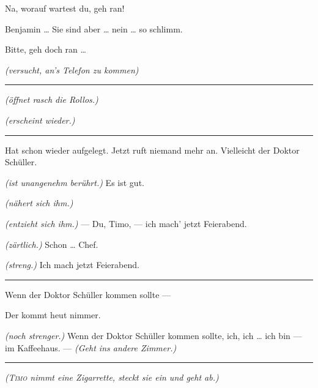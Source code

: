 \documentclass[
	final,
	a4paper,
	ngerman,
	mpinclude = true, %
	twoside = true,
	open = right,
	cleardoublepage = plain,
	DIV = 13,
	BCOR = 1cm,
	titlepage = firstiscover,
	]{scrbook}
\newcommand{\direction}[1]{\textit{(#1)}}
\newenvironment{deletion}{%
		\vspace{0.25\baselineskip}
		\hrule
		\vspace{0.25\baselineskip}
		\color{darkgray}
	}{
		\color{black}
		\vspace{0.25\baselineskip}
		\hrule 
		\vspace{0.25\baselineskip}
	}
\newcommand{\thecharacter}[1]{\textup{\textsc{#1}}\xspace}
\newcommand{\thepraktikant}{\thecharacter{Timo}}
\newcommand{\theherr}{\thecharacter{Benjamin}}
\newcommand{\character}[1]{\item[#1:]}
\newcommand{\praktikant}{\character{\thepraktikant}}
\newcommand{\herr}{\character{\theherr}}
\begin{document}
\begin{play}
	\herr
	Na, worauf wartest du, geh ran!

	\praktikant
	Benjamin \ldots{} Sie sind aber \ldots{} nein \ldots{} so schlimm.

	\herr
	Bitte, geh doch ran \ldots{}

	\praktikant
	\direction{versucht, an's Telefon zu kommen}
	\begin{deletion}
	\herr
	\direction{öffnet rasch die Rollos.}

	\praktikant
	\direction{erscheint wieder.}
	\end{deletion}
	Hat schon wieder aufgelegt. Jetzt ruft niemand mehr an. Vielleicht der Doktor Schüller.

	\herr
	\direction{ist unangenehm berührt.} Es ist gut.

	\praktikant
	\direction{nähert sich ihm.}

	\herr
	\direction{entzieht sich ihm.} --- Du, Timo, --- ich mach' jetzt Feierabend.

	\praktikant
	\direction{zärtlich.} Schon \ldots{} Chef.

	\herr
	\direction{streng.} Ich mach jetzt Feierabend.
	\begin{deletion}
		Wenn der Doktor Schüller kommen sollte ---

	\praktikant
	Der kommt heut nimmer.

	\herr
	\direction{noch strenger.} Wenn der Doktor Schüller kommen sollte, ich, ich \ldots{} ich bin --- im Kaffeehaus. --- \direction{Geht ins andere Zimmer.}
	\end{deletion}

	\direction{\thepraktikant{} nimmt eine Zigarrette, steckt sie ein und geht ab.}
\end{play}
\end{document}

